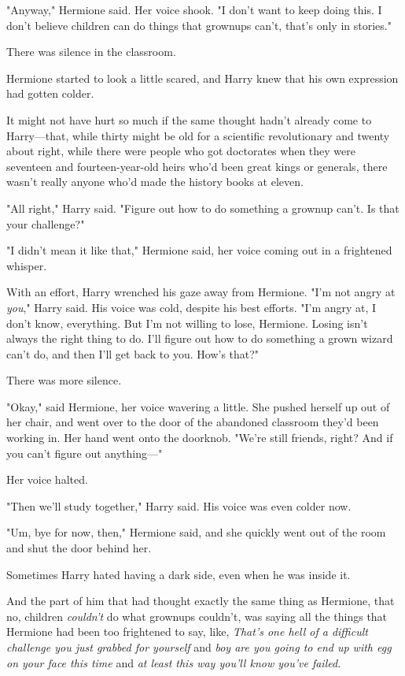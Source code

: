 "Anyway," Hermione said. Her voice shook. "I don't want to keep doing this. I
don't believe children can do things that grownups can't, that's only in
stories."

There was silence in the classroom.

Hermione started to look a little scared, and Harry knew that his own
expression had gotten colder.

It might not have hurt so much if the same thought hadn't already come to
Harry---that, while thirty might be old for a scientific revolutionary and
twenty about right, while there were people who got doctorates when they were
seventeen and fourteen-year-old heirs who'd been great kings or generals, there
wasn't really anyone who'd made the history books at eleven.

"All right," Harry said. "Figure out how to do something a grownup can't. Is
that your challenge?"

"I didn't mean it like that," Hermione said, her voice coming out in a
frightened whisper.

With an effort, Harry wrenched his gaze away from Hermione. "I'm not angry at
\emph{you}," Harry said. His voice was cold, despite his best efforts. "I'm
angry at, I don't know, everything. But I'm not willing to lose, Hermione.
Losing isn't always the right thing to do. I'll figure out how to do something
a grown wizard can't do, and then I'll get back to you. How's that?"

There was more silence.

"Okay," said Hermione, her voice wavering a little. She pushed herself up out
of her chair, and went over to the door of the abandoned classroom they'd been
working in. Her hand went onto the doorknob. "We're still friends, right? And
if you can't figure out anything---"

Her voice halted.

"Then we'll study together," Harry said. His voice was even colder now.

"Um, bye for now, then," Hermione said, and she quickly went out of the room
and shut the door behind her.

Sometimes Harry hated having a dark side, even when he was inside it.

And the part of him that had thought exactly the same thing as Hermione, that
no, children \emph{couldn't} do what grownups couldn't, was saying all the
things that Hermione had been too frightened to say, like, \emph{That's one
hell of a difficult challenge you just grabbed for yourself} and \emph{boy are
you going to end up with egg on your face this time} and \emph{at least this
way you'll know you've failed.}

